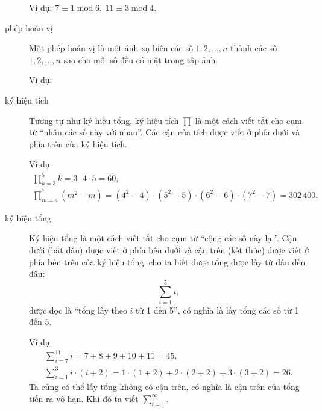 \begin{description}
		Ví dụ: $7\equiv 1\operatorname{mod} 6,\ 11\equiv 3\operatorname{mod} 4$. 

	\item[phép hoán vị]  Một phép hoán vị là một ánh xạ biến các số   $1,2,\dots,n$  thành các số  $1,2,\dots,n$ sao cho mỗi số đều có mặt trong tập ảnh. 

		Ví dụ:
		\begin{figure} 
			\def\svgwidth{200pt} 
			 
		\end{figure} 
	
	\item[ký hiệu tích] Tương tự như  ký hiệu  tổng, ký hiệu tích  $\prod$  là  một cách viết tắt   cho  cụm từ \enquote{nhân các số  này với nhau}. Các cận của tích được viết ở phía dưới và phía trên của ký hiệu tích.

		Ví dụ: 
		\begin{gather*}
			\prod\limits_{k=3}^5 k = 3\cdot 4\cdot 5 = 60,\\
			\prod\limits_{m=4}^7 (m^2 - m) = (4^2-4)\cdot(5^2-5)\cdot (6^2-6) \cdot (7^2-7)= 302\,400.
		\end{gather*}
		\item[ký hiệu tổng]  Ký hiệu tổng là  một cách viết tắt  cho cụm từ \enquote{cộng các số này lại}.  Cận dưới (bắt đầu)  được viết ở phía bên dưới và cận trên (kết thúc) được viết ở phía bên trên của ký hiệu tổng, cho ta biết được tổng được lấy từ đâu đến đâu:		
		\begin{equation*}
			\sum\limits_{i=1}^5 i,
		\end{equation*}
		được đọc là \enquote{tổng lấy  theo $i$ từ 1 đến 5}, có nghĩa là  lấy tổng các số từ 1 đến 5. 

		Ví dụ:
		\begin{gather*}
			\sum\limits_{i=7}^{11} i= 7+8+9+10+11 = 45,\\
			\sum\limits_{i=1}^3 i\cdot (i+2) = 1\cdot (1+2) + 2\cdot (2+2) + 3\cdot (3+2) = 26.
		\end{gather*}
		Ta cũng có thể lấy tổng  không có cận trên,  có nghĩa là cận trên của tổng tiến ra  vô hạn. Khi đó ta viết  $\sum\limits_{i=1}^\infty$. 
\end{description}


